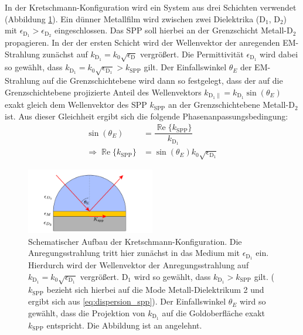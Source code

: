\documentclass[titlepage,  ngerman]{article}
\renewcommand{\Re}{\operatorname{\mathbb{R}e}}
\begin{document}
	In der Kretschmann-Konfiguration wird ein System aus drei Schichten verwendet (Abbildung \ref{fig:kretschman}). Ein dünner Metallfilm wird zwischen zwei Dielektrika ($\mathrm{D}_1$, $\mathrm{D}_2$) mit $\epsilon_{\mathrm{D}_1} > \epsilon_{\mathrm{D}_2}$ eingeschlossen. Das SPP soll hierbei an der Grenzschicht Metall-$\mathrm{D}_2$ propagieren. In der der ersten Schicht wird der Wellenvektor der anregenden EM-Strahlung zunächst auf $k_\mathrm{\mathrm{D}_1} = k_0 \sqrt{\epsilon_\mathrm{D}}$ vergrößert. Die Permittivität $\epsilon_{\mathrm{D}_1}$ wird dabei so gewählt, dass $k_\mathrm{\mathrm{D}_1} = k_0 \sqrt{\epsilon_{\mathrm{D}_1}} > k_\mathrm{SPP}$ gilt. Der Einfallswinkel $\theta_E$ der EM-Strahlung auf die Grenzschichtebene wird dann so festgelegt, dass der auf die Grenzschichtebene projizierte Anteil des Wellenvektors $k_{\mathrm{\mathrm{D}_1}\parallel} = k_{\mathrm{\mathrm{D}_1}} \sin(\theta_E)$ exakt gleich dem Wellenvektor des SPP $k_\mathrm{SPP}$ an der Grenzschichtebene Metall-$\mathrm{D}_2$ ist. Aus dieser Gleichheit ergibt sich die folgende Phasenanpassungsbedingung: 
	\begin{align}
		\label{eq:phase_condition_kretschmann}
		\sin(\theta_E) &= \dfrac{\Re\{k_{\mathrm{SPP}}\}}{k_{\mathrm{D}_1}}\\
		\Rightarrow \Re\{k_{\mathrm{SPP}}\} &= \sin(\theta_E) k_0 \sqrt{\epsilon_{\mathrm{D}_1}}
	\end{align}  
	\begin{figure}[h] 
		\centering
		\includegraphics[width=0.5\textwidth]{figures/Kretschmann.pdf}
		\caption[Kretschmann-Konfiguration]{Schematischer Aufbau der Kretschmann-Konfiguration. Die Anregungsstrahlung tritt hier zunächst in das Medium mit $\epsilon_{\mathrm{D}_1}$ ein. Hierdurch wird der Wellenvektor der Anregungsstrahlung auf $k_{\mathrm{D}_1}=k_0\sqrt{\epsilon_{\mathrm{D}_1}}$ vergrößert. $\mathrm{D}_1$ wird so gewählt, dass $k_{\mathrm{D}_1}> k_{\mathrm{SPP}}$ gilt. ($k_{\mathrm{SPP}}$ bezieht sich hierbei auf die Mode Metall-Dielektrikum 2 und ergibt sich aus \eqref{eq:dispersion_spp}). Der Einfallswinkel $\theta_E$ wird so gewählt, dass die Projektion von $k_{\mathrm{D}_1}$ auf die Goldoberfläche exakt $k_{\mathrm{SPP}}$ entspricht. Die Abbildung ist an \cite{Jaruschewski.2020} angelehnt.}
		\label{fig:kretschman}
	\end{figure}
\end{document}
